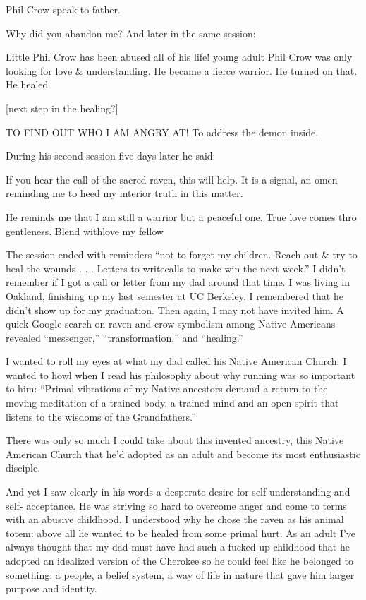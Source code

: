 \documentclass[12pt]{book}
\begin{document}
Phil-Crow speak to father.

Why did you abandon me? And later in the same session:

Little Phil Crow has been abused all of his life! young adult Phil Crow was only looking for love \& understanding. He became a fierce warrior. He turned on that. He healed

[next step in the healing?]

TO FIND OUT WHO I AM ANGRY AT! To address the demon inside.

During his second session five days later he said:

If you hear the call of the sacred raven, this will help. It is a signal, an omen reminding me to heed my interior truth in this matter.

He reminds me that I am still a warrior but a peaceful one. True love comes thro gentleness. Blend with\/love my fellow

The session ended with reminders ``not to forget my children. Reach out \& try to heal the wounds . . . Letters to write\/calls to make w\/in the next week.'' I didn't remember if I got a call or letter from my dad around that time. I was living in Oakland, finishing up my last semester at UC Berkeley. I remembered that he didn't show up for my graduation. Then again, I may not have invited him. A quick Google search on raven and crow symbolism among Native Americans revealed ``messenger,'' ``transformation,'' and ``healing.''

I wanted to roll my eyes at what my dad called his Native American Church. I wanted to howl when I read his philosophy about why running was so important to him: ``Primal vibrations of my Native ancestors demand a return to the moving meditation of a trained body, a trained mind and an open spirit that listens to the wisdoms of the Grandfathers.''

There was only so much I could take about this invented ancestry, this Native American Church that he'd adopted as an adult and become its most enthusiastic disciple.

And yet I saw clearly in his words a desperate desire for self-understanding and self- acceptance. He was striving so hard to overcome anger and come to terms with an abusive childhood. I understood why he chose the raven as his animal totem: above all he wanted to be healed from some primal hurt. As an adult I've always thought that my dad must have had such a fucked-up childhood that he adopted an idealized version of the Cherokee so he could feel like he belonged to something: a people, a belief system, a way of life in nature that gave him larger purpose and identity.
\end{document}
